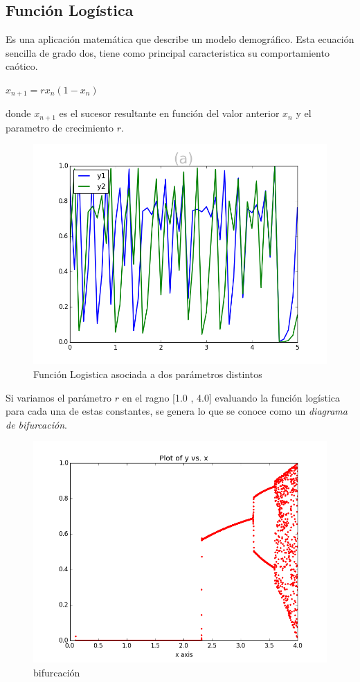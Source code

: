 \documentclass[DIV=calc, paper=a4, fontsize=11pt, twocolumn]{scrartcl}	 %
\begin{document}
\subsection*{Función Logística}
Es una aplicación matemática que describe un modelo demográfico. Esta ecuación sencilla de grado dos, tiene como principal caracteristica su comportamiento caótico.
\begin{center}$x_{n+1}=rx_n(1-x_n)$\end{center}
donde $x_{n+1}$ es el sucesor resultante en función del valor anterior $x_n$ y el parametro de crecimiento $r$.
\begin{figure}[htp]
\centering
\includegraphics[scale=0.4]{caos.png}
\caption{Función Logistica asociada a dos parámetros distintos}
\label{}
\end{figure}
Si variamos el parámetro $r$ en el ragno [1.0 , 4.0] evaluando la función logística para cada una de estas constantes, se genera lo que se conoce como un \emph{diagrama de bifurcación}.
\begin{figure}[htp]
\centering
\includegraphics[scale=0.4]{bifurcacion.png}
\caption{bifurcación}
\label{}
\end{figure}
\end{document}
